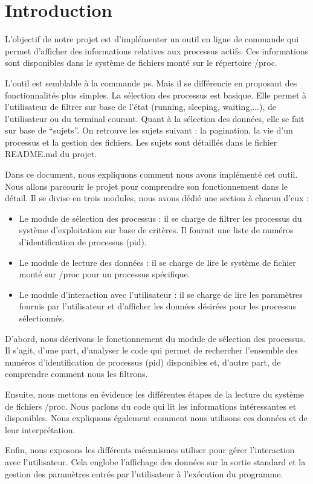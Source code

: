 \section{Introduction}
L’objectif de notre projet est d’implémenter un outil en ligne de commande qui permet d’afficher des informations relatives aux processus actifs. Ces informations sont disponibles dans le système de fichiers monté sur le répertoire /proc.

L’outil est semblable à la commande ps. Mais il se différencie en proposant des fonctionnalités plus simples.  La sélection des processus est basique. Elle permet à l’utilisateur de filtrer sur base de l’état (running, sleeping, waiting,...), de l’utilisateur ou du terminal courant. Quant à la sélection des données, elle se fait sur base de “sujets”. On retrouve les sujets suivant : la pagination, la vie d’un processus et la gestion des fichiers. Les sujets sont détaillés dans le fichier README.md du projet.

Dans ce document, nous expliquons comment nous avons implémenté cet outil. Nous allons parcourir le projet pour comprendre son fonctionnement dans le détail. Il se divise en trois modules, nous avons dédié une section à chacun d’eux :

\begin{itemize}
\item Le module de sélection des processus : il se charge de filtrer les processus du système d’exploitation sur base de critères. Il fournit une liste de numéros d’identification de processus (pid).
\item Le module de lecture des données : il se charge de lire le système de fichier monté sur /proc pour un processus spécifique.
\item Le module d’interaction avec l’utilisateur : il se charge de lire les paramètres fournis par l’utilisateur et d’afficher les données désirées pour les processus sélectionnés.
\end{itemize}

D’abord, nous décrivons le fonctionnement du module de sélection des processus. Il s’agit, d’une part, d’analyser le code qui permet de rechercher l’ensemble des numéros  d’identification de processus (pid) disponibles et, d’autre part, de comprendre comment nous les filtrons.

Ensuite, nous mettons en évidence les différentes étapes de la lecture du système de fichiers /proc. Nous parlons du code qui lit les informations intéressantes et disponibles. Nous expliquons également comment nous utilisons ces données et de leur interprétation.

Enfin, nous exposons les différents mécanismes utiliser pour gérer l’interaction avec l’utilisateur. Cela englobe l’affichage des données sur la sortie standard et la gestion des paramètres entrés par l’utilisateur à l’exécution du programme.
